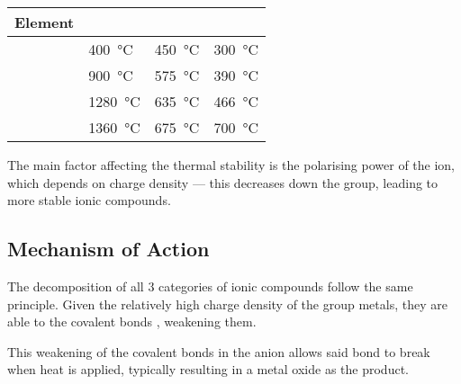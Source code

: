 			\begin{center}\begin{table}[htb]\renewcommand{\arraystretch}{1.5}
			\begin{tabu} to \textwidth {X[c,m] | X[c,m] | X[c,m] | X[c,m]}

				Element		&		&		&		\\	\hline
						&	\SI{400}{\celsius}	&\SI{450}{\celsius}	&\SI{300}{\celsius}		\\	\hline
						&	\SI{900}{\celsius}	&\SI{575}{\celsius}	&\SI{390}{\celsius}		\\	\hline
						&	\SI{1280}{\celsius}	&\SI{635}{\celsius}	&\SI{466}{\celsius}		\\	\hline
						&	\SI{1360}{\celsius}	&\SI{675}{\celsius}	&\SI{700}{\celsius}		\\	\hline

			\end{tabu}
			\end{table}\end{center}\vspace{-10mm}

			The main factor affecting the thermal stability is the polarising power of the ion, which depends
			on charge density --- this decreases down the group, leading to more stable ionic compounds.



		\subsection{Mechanism of Action}

			The decomposition of all 3 categories of ionic compounds follow the same principle. Given the
			relatively high charge density of the group \rtwo{} metals, they are able to  the
			covalent bonds , weakening them.

			This weakening of the covalent bonds in the anion allows said bond to break when heat is applied,
			typically resulting in a metal oxide as the product.



